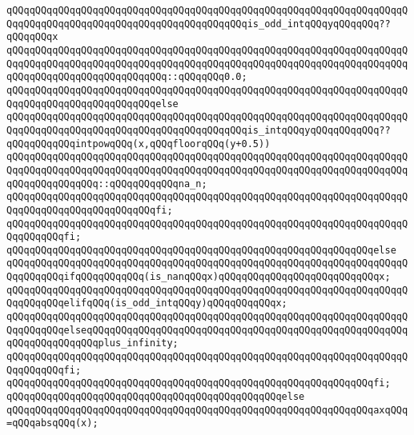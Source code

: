 \newline
\verb|qQQqqQQqqQQqqQQqqQQqqQQqqQQqqQQqqQQqqQQqqQQqqQQqqQQqqQQqqQQqqQQqqQQqqQQqqQQqqQQqqQQqqQQqqQQqqQQqqQQqqQQqqQQqqQQqis_odd_intqQQqyqQQqqQQq??qQQqqQQqx|\newline
\verb|qQQqqQQqqQQqqQQqqQQqqQQqqQQqqQQqqQQqqQQqqQQqqQQqqQQqqQQqqQQqqQQqqQQqqQQqqQQqqQQqqQQqqQQqqQQqqQQqqQQqqQQqqQQqqQQqqQQqqQQqqQQqqQQqqQQqqQQqqQQqqQQqqQQqqQQqqQQqqQQqqQQqqQQq::qQQqqQQq0.0;|\newline
\newline
\verb|qQQqqQQqqQQqqQQqqQQqqQQqqQQqqQQqqQQqqQQqqQQqqQQqqQQqqQQqqQQqqQQqqQQqqQQqqQQqqQQqqQQqqQQqqQQqqQQqelse|\newline
\verb|qQQqqQQqqQQqqQQqqQQqqQQqqQQqqQQqqQQqqQQqqQQqqQQqqQQqqQQqqQQqqQQqqQQqqQQqqQQqqQQqqQQqqQQqqQQqqQQqqQQqqQQqqQQqqQQqis_intqQQqyqQQqqQQqqQQq??qQQqqQQqqQQqintpowqQQq(x,qQQqfloorqQQq(y+0.5))|\newline
\verb|qQQqqQQqqQQqqQQqqQQqqQQqqQQqqQQqqQQqqQQqqQQqqQQqqQQqqQQqqQQqqQQqqQQqqQQqqQQqqQQqqQQqqQQqqQQqqQQqqQQqqQQqqQQqqQQqqQQqqQQqqQQqqQQqqQQqqQQqqQQqqQQqqQQqqQQqqQQq::qQQqqQQqqQQqna_n;|\newline
\verb|qQQqqQQqqQQqqQQqqQQqqQQqqQQqqQQqqQQqqQQqqQQqqQQqqQQqqQQqqQQqqQQqqQQqqQQqqQQqqQQqqQQqqQQqqQQqqQQqfi;|\newline
\verb|qQQqqQQqqQQqqQQqqQQqqQQqqQQqqQQqqQQqqQQqqQQqqQQqqQQqqQQqqQQqqQQqqQQqqQQqqQQqqQQqfi;|\newline
\verb|qQQqqQQqqQQqqQQqqQQqqQQqqQQqqQQqqQQqqQQqqQQqqQQqqQQqqQQqqQQqqQQqelse|\newline
\verb|qQQqqQQqqQQqqQQqqQQqqQQqqQQqqQQqqQQqqQQqqQQqqQQqqQQqqQQqqQQqqQQqqQQqqQQqqQQqqQQqifqQQqqQQqqQQq(is_nanqQQqx)qQQqqQQqqQQqqQQqqQQqqQQqqQQqx;|\newline
\verb|qQQqqQQqqQQqqQQqqQQqqQQqqQQqqQQqqQQqqQQqqQQqqQQqqQQqqQQqqQQqqQQqqQQqqQQqqQQqqQQqelifqQQq(is_odd_intqQQqy)qQQqqQQqqQQqx;|\newline
\verb|qQQqqQQqqQQqqQQqqQQqqQQqqQQqqQQqqQQqqQQqqQQqqQQqqQQqqQQqqQQqqQQqqQQqqQQqqQQqqQQqelseqQQqqQQqqQQqqQQqqQQqqQQqqQQqqQQqqQQqqQQqqQQqqQQqqQQqqQQqqQQqqQQqqQQqqQQqplus_infinity;|\newline
\verb|qQQqqQQqqQQqqQQqqQQqqQQqqQQqqQQqqQQqqQQqqQQqqQQqqQQqqQQqqQQqqQQqqQQqqQQqqQQqqQQqfi;|\newline
\verb|qQQqqQQqqQQqqQQqqQQqqQQqqQQqqQQqqQQqqQQqqQQqqQQqqQQqqQQqqQQqqQQqfi;|\newline
\verb|qQQqqQQqqQQqqQQqqQQqqQQqqQQqqQQqqQQqqQQqqQQqqQQqelse|\newline
\verb|qQQqqQQqqQQqqQQqqQQqqQQqqQQqqQQqqQQqqQQqqQQqqQQqqQQqqQQqqQQqqQQqaxqQQq=qQQqabsqQQq(x);|\newline
